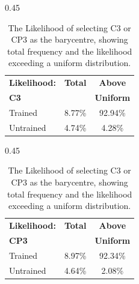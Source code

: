 \begin{table}[H]
    \begin{subtable}[t]{0.45\textwidth}
        \centering
        \begin{tabular}{| l | c c |}
            \hline
            \textbf{Likelihood:} & \textbf{Total} & \textbf{Above}   \\       \textbf{C3}         &                &  \textbf{Uniform}\\ 
            \hline
            Trained & 8.77\% & 92.94\%  \\  
            Untrained & 4.74\% & 4.28\%  \\
            \hline
        \end{tabular}    
        \caption{C3 Likelihood}
    \end{subtable}
    \hfill
    \begin{subtable}[t]{0.45\textwidth}
        \centering
        \begin{tabular}{| l | c c |}
            \hline
            \textbf{Likelihood:} & \textbf{Total} & \textbf{Above}   \\       \textbf{CP3}         &                &  \textbf{Uniform}\\ 
            \hline
            Trained & 8.97\% & 92.34\%  \\  
            Untrained & 4.64\% & 2.08\% \\
            \hline
        \end{tabular}
        \caption{CP3 Likelihood}
    \end{subtable}
    \caption{The Likelihood of selecting C3 or CP3 as the barycentre, showing total frequency and the likelihood exceeding a uniform distribution.}
    \label{tab:likelihood}
\end{table}